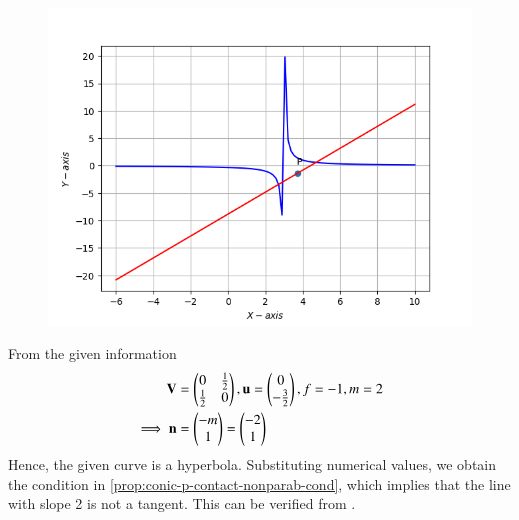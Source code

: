 	\begin{figure}[!ht]
		\centering
 \includegraphics[width=\columnwidth]{chapters/12/6/3/11/figs/con_fig.png}
		\caption{}
		\label{fig:12/6/3/11}
  	\end{figure}
From the given information
\begin{align}
	\mathbf{V}
	&=\begin{pmatrix}
		0 &\frac{1}{2}\\\frac{1}{2} & 0\\
	\end{pmatrix},
\mathbf{u} = \begin{pmatrix}
0 \\-\frac{3}{2}
\end{pmatrix},  f = -1, m=2
	\label{12/6/3/11/eq1}
	\\
	\implies
	\mathbf{n}&=\begin{pmatrix}
-m \\ 1 
\end{pmatrix} = \begin{pmatrix}-2 \\ 1\end{pmatrix}  \\
\label{12/6/3/11/eq2}
\end{align}
Hence, the given curve is a hyperbola.
Substituting  numerical values, we obtain the condition in 
	\eqref{prop:conic-p-contact-nonparab-cond},
which implies that the line with slope 2 is not a tangent.  This can be verified from  
		.

